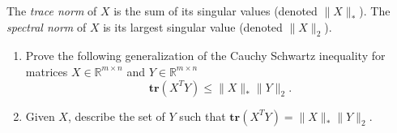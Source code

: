 \documentclass{article}
\newcommand{\R}{\mathbb R}
\newcommand{\tr}{\mathbf{tr}}
\begin{document}
\begin{enumerate}
The \emph{trace norm} of $X$ is the sum of its singular values (denoted $\|X\|_*$). The \emph{spectral norm} of $X$ is its largest singular value (denoted $\|X\|_2$). 

\begin{enumerate}

\item Prove the following generalization of the Cauchy Schwartz inequality for matrices $X\in \R^{m\times n}$ and $Y \in \R^{m\times n}$
\[
\tr(X^TY) \leq \|X\|_*\|Y\|_2.
\]



\item Given $X$, describe the set of $Y$ such that $\tr(X^TY) = \|X\|_*\|Y\|_2$.

\end{enumerate}
\end{enumerate}
\end{document}
